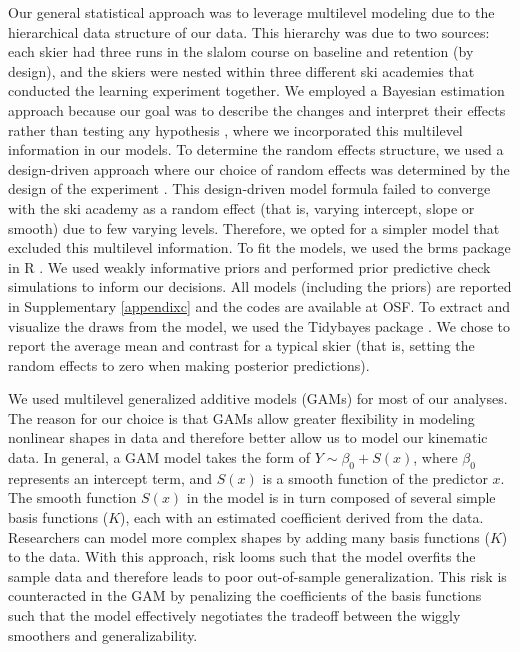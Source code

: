 \documentclass{article}
\begin{document}
Our general statistical approach was to leverage multilevel modeling due to the hierarchical data structure of our data. This hierarchy was due to two sources: each skier had three runs in the slalom course on baseline and retention (by design), and the skiers were nested within three different ski academies that conducted the learning experiment together. We employed a Bayesian estimation approach because our goal was to describe the changes and interpret their effects rather than testing any hypothesis \cite{kruschke_bayesian_2018}, where we incorporated this multilevel information in our models. To determine the random effects structure, we used a design-driven approach where our choice of random effects was determined by the design of the experiment \cite{barr_learning_2021, barr_random_2013}. This design-driven model formula failed to converge with the ski academy as a random effect  (that is, varying intercept, slope or smooth) due to few varying levels. Therefore, we opted for a simpler model that excluded this multilevel information. To fit the models, we used the brms \cite{burkner_brms_2017} package in R \cite{r_core_team_r_2022}. We used weakly informative priors and performed prior predictive check simulations to inform our decisions. All models (including the priors) are reported in Supplementary \ref{appendixc} and the codes are available at OSF. To extract and visualize the draws from the model, we used the Tidybayes package \cite{kay_tidybayes_nodate}. We chose to report the average mean and contrast for a typical skier (that is, setting the random effects to zero when making posterior predictions). 

We used multilevel generalized additive models (GAMs) \cite{pedersen_hierarchical_2019, wood_generalized_2017} for most of our analyses. The reason for our choice is that GAMs allow greater flexibility in modeling nonlinear shapes in data and therefore better allow us to model our kinematic data. In general, a GAM model takes the form of $Y \sim \beta_0 + S(x)$, where $\beta_0$ represents an intercept term, and $S(x)$ is a smooth function of the predictor $x$. The smooth function $S(x)$ in the model is in turn composed of several simple basis functions ($K$), each with an estimated coefficient derived from the data. Researchers can model more complex shapes by adding many basis functions ($K$) to the data. With this approach, risk looms such that the model overfits the sample data and therefore leads to poor out-of-sample generalization. This risk is counteracted in the GAM by penalizing the coefficients of the basis functions such that the model effectively negotiates the tradeoff between the wiggly smoothers and generalizability. 
\end{document}
